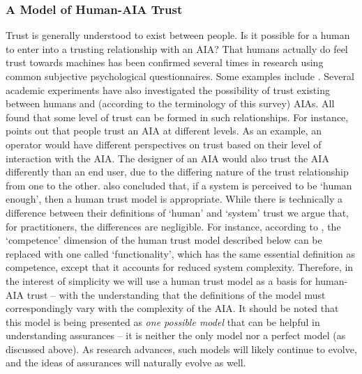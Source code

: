 \subsubsection{A Model of Human-AIA Trust}
        Trust is generally understood to exist between people. Is it possible for a human to enter into a trusting relationship with an AIA? That humans actually do feel trust towards machines has been %
confirmed several times in research using common subjective psychological questionnaires. Some examples include \cite{Muir1996-gt,Reeves1997-ad,Groom2007-bz,Mcknight2011-gv,Riley1996-qm,Bainbridge2011-pl,Kaniarasu2012-mo,Salem2015-md,Desai2012-rc, Freedy2007-sg, Inagaki1998-cl, Kaniarasu2013-ho, Wang2016-id}. Several academic experiments have also investigated the possibility of trust existing between humans and (according to the terminology of this survey) AIAs.  All found that some level of trust can be formed in such relationships. For instance, \citet{Lacher2014-yc} points out that people trust an AIA at different levels. As an example, an operator would have different perspectives on trust based on their level of interaction with the AIA. The designer of an AIA would also trust the AIA differently than an end user, due to the differing nature of the trust relationship from one to the other. 
%
\citet{Tripp2011-rx} %
also concluded that, if a system is perceived to be `human enough', then a human trust model is appropriate. While there is technically a difference between their definitions of `human' and `system' trust we argue that, for practitioners, the differences are negligible. For instance, according to \cite{Tripp2011-rx}, the `competence' dimension of the human trust model described below can be replaced with one called `functionality', which has the same essential definition as competence, except that it accounts for reduced system complexity. 
%
Therefore, in the interest of simplicity we will use a human trust model as a basis for human-AIA trust -- with the understanding that the definitions of the model must correspondingly vary with the complexity of the AIA.
%
It should be noted that this model is being presented as \emph{one possible model} that can be helpful in understanding assurances -- it is neither the only model nor a perfect model (as discussed above). As research advances, such models will likely continue to evolve, and the ideas of assurances will naturally evolve as well.

